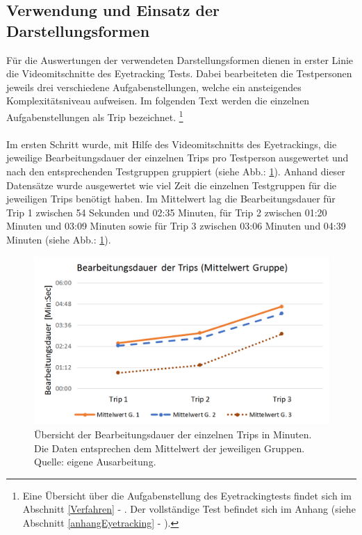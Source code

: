 \documentclass[Bachelorarbeit.tex]{subfiles}
\begin{document}
\subsection{Verwendung und Einsatz der Darstellungsformen}
\label{ergebnis_darstellungsformen}
Für die Auswertungen der verwendeten Darstellungsformen dienen in erster Linie die Videomitschnitte des Eyetracking Tests. 
Dabei bearbeiteten die Testpersonen jeweils drei verschiedene Aufgabenstellungen, welche ein ansteigendes Komplexitätsniveau aufweisen.
Im folgenden Text werden die einzelnen Aufgabenstellungen als Trip bezeichnet.
\footnote{Eine Übersicht über die Aufgabenstellung des Eyetrackingtests findet sich im Abschnitt \ref{Verfahren} - . Der vollständige Test befindet sich im Anhang (siehe Abschnitt \ref{anhangEyetracking} - ). 
	}\\
	\\
Im ersten Schritt wurde, mit Hilfe des Videomitschnitts des Eyetrackings, die jeweilige Bearbeitungsdauer der einzelnen Trips pro Testperson ausgewertet und nach den entsprechenden Testgruppen gruppiert (siehe Abb.: \ref{fig:BearbeitungsdauerTrip}).  
Anhand dieser Datensätze wurde ausgewertet wie viel Zeit die einzelnen Testgruppen für die jeweiligen Trips benötigt haben.
Im Mittelwert lag die Bearbeitungsdauer für Trip 1 zwischen 54 Sekunden und 02:35 Minuten, für Trip 2 zwischen 01:20 Minuten und 03:09 Minuten sowie für Trip 3 zwischen 03:06 Minuten und 04:39 Minuten (siehe Abb.: \ref{fig:BearbeitungsdauerTrip}).
\begin{figure}[H]
\centering
\includegraphics[width=0.7\linewidth]{img/Evaluation/Darstellungsformen/BearbeitungsdauerTrip}
\caption[Übersicht der Bearbeitungsdauer]{Übersicht der Bearbeitungsdauer der einzelnen Trips in Minuten. Die Daten entsprechen dem Mittelwert der jeweiligen Gruppen.  
Quelle: eigene Ausarbeitung.
	}
\label{fig:BearbeitungsdauerTrip}
\end{figure}
\end{document}
